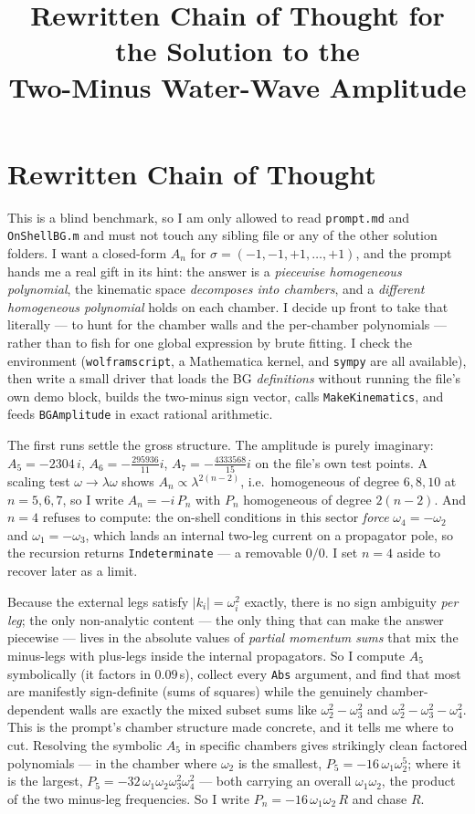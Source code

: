 \documentclass{article}
\title{Rewritten Chain of Thought for the Solution to the\\
Two-Minus Water-Wave Amplitude}
\author{}
\date{}
\begin{document}
\maketitle


\section*{Rewritten Chain of Thought}

This is a blind benchmark, so I am only allowed to read \texttt{prompt.md} and
\texttt{OnShellBG.m} and must not touch any sibling file or any of the other
solution folders. I want a closed-form $A_n$ for $\sigma=(-1,-1,+1,\dots,+1)$,
and the prompt hands me a real gift in its hint: the answer is a \emph{piecewise
homogeneous polynomial}, the kinematic space \emph{decomposes into chambers}, and
a \emph{different homogeneous polynomial} holds on each chamber. I decide up front
to take that literally --- to hunt for the chamber walls and the per-chamber
polynomials --- rather than to fish for one global expression by brute fitting. I
check the environment (\texttt{wolframscript}, a Mathematica kernel, and
\texttt{sympy} are all available), then write a small driver that loads the BG
\emph{definitions} without running the file's own demo block, builds the
two-minus sign vector, calls \texttt{MakeKinematics}, and feeds
\texttt{BGAmplitude} in exact rational arithmetic.

The first runs settle the gross structure. The amplitude is purely imaginary:
$A_5=-2304\,i$, $A_6=-\tfrac{295936}{11}i$, $A_7=-\tfrac{4333568}{15}i$ on the
file's own test points. A scaling test $\omega\to\lambda\omega$ shows
$A_n\propto\lambda^{2(n-2)}$, i.e.\ homogeneous of degree $6,8,10$ at
$n=5,6,7$, so I write $A_n=-i\,P_n$ with $P_n$ homogeneous of degree $2(n-2)$.
And $n=4$ refuses to compute: the on-shell conditions in this sector \emph{force}
$\omega_4=-\omega_2$ and $\omega_1=-\omega_3$, which lands an internal two-leg
current on a propagator pole, so the recursion returns \texttt{Indeterminate} ---
a removable $0/0$. I set $n=4$ aside to recover later as a limit.

Because the external legs satisfy $|k_i|=\omega_i^2$ exactly, there is no sign
ambiguity \emph{per leg}; the only non-analytic content --- the only thing that
can make the answer piecewise --- lives in the absolute values of \emph{partial
momentum sums} that mix the minus-legs with plus-legs inside the internal
propagators. So I compute $A_5$ symbolically (it factors in $0.09$\,s), collect
every \texttt{Abs} argument, and find that most are manifestly sign-definite
(sums of squares) while the genuinely chamber-dependent walls are exactly the
mixed subset sums like $\omega_2^2-\omega_3^2$ and
$\omega_2^2-\omega_3^2-\omega_4^2$. This is the prompt's chamber structure made
concrete, and it tells me where to cut. Resolving the symbolic $A_5$ in specific
chambers gives strikingly clean factored polynomials --- in the chamber where
$\omega_2$ is the smallest, $P_5=-16\,\omega_1\omega_2^5$; where it is the
largest, $P_5=-32\,\omega_1\omega_2\omega_3^2\omega_4^2$ --- both carrying an
overall $\omega_1\omega_2$, the product of the two minus-leg frequencies. So I
write $P_n=-16\,\omega_1\omega_2\,R$ and chase $R$.
\end{document}
